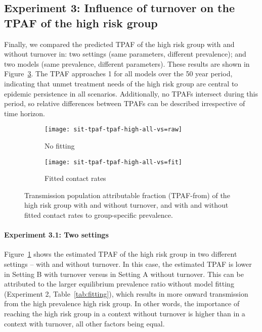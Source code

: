 \subsection{Experiment 3: Influence of turnover on the TPAF of the high risk group}
\label{ss:res-tpaf}
Finally, we compared the predicted TPAF of the high risk group with and without turnover in:
two settings (same parameters, different prevalence); and
two models (same prevalence, different parameters).
These results are shown in Figure~\ref{fig:tpaf}.
The TPAF approaches 1 for all models over the 50 year period,
indicating that unmet treatment needs of the high risk group
are central to epidemic persistence in all scenarios.
Additionally, no TPAFs intersect during this period,
so relative differences between TPAFs can be described irrespective of time horizon.
\begin{figure}[!tbp]
  \centering
  \begin{subfigure}{0.45\linewidth}
    \centering
    \texttt{[image: sit-tpaf-tpaf-high-all-vs=raw]}
    \caption{No fitting}
    \label{fig:tpaf-raw}
  \end{subfigure}
  \begin{subfigure}{0.45\linewidth}
    \centering
    \texttt{[image: sit-tpaf-tpaf-high-all-vs=fit]}
    \caption{Fitted contact rates}
    \label{fig:tpaf-fit}
  \end{subfigure}
  \caption{Transmission population attributable fraction (TPAF-from)
    of the high risk group with and without turnover,
    and with and without fitted contact rates to group-specific prevalence.}
  \label{fig:tpaf}
\end{figure}
\paragraph{Experiment 3.1: Two settings}
\label{p:res-tpaf-raw}
Figure~\ref{fig:tpaf-raw} shows the estimated TPAF of the high risk group
in two different settings -- with and without turnover.
In this case, the estimated TPAF is lower
in Setting B with turnover versus
in Setting A without turnover.
This can be attributed to
the larger equilibrium prevalence ratio without model fitting
(Experiment 2, Table~\ref{tab:fitting}),
which results in more onward transmission from the high prevalence high risk group.
In other words, the importance of reaching the high risk group
in a context without turnover is higher than in a context with turnover,
all other factors being equal.
